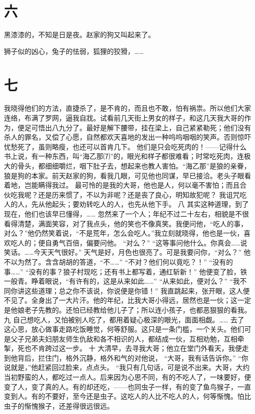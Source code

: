 \documentclass[12pt,UTF8]{ctexbook}
\begin{document}
\section{六}

黑漆漆的，不知是日是夜。赵家的狗又叫起来了。

狮子似的凶心，兔子的怯弱，狐狸的狡猾，……

\section{七}

我晓得他们的方法，直捷杀了，是不肯的，而且也不敢，怕有祸祟。所以他们大家连络，布满了罗网，逼我自戕。试看前几天街上男女的样子，和这几天我大哥的作为，便足可悟出八九分了。最好是解下腰带，挂在梁上，自己紧紧勒死；他们没有杀人的罪名，又偿了心愿，自然都欢天喜地的发出一种呜呜咽咽的笑声。否则惊吓忧愁死了，虽则略瘦，也还可以首肯几下。
他们是只会吃死肉的！——记得什么书上说，有一种东西，叫“海乙那⑺”的，眼光和样子都很难看；时常吃死肉，连极大的骨头，都细细嚼烂，咽下肚子去，想起来也教人害怕。“海乙那”是狼的亲眷，狼是狗的本家。前天赵家的狗，看我几眼，可见他也同谋，早已接洽。老头子眼看着地，岂能瞒得我过。
最可怜的是我的大哥，他也是人，何以毫不害怕；而且合伙吃我呢？还是历来惯了，不以为非呢？还是丧了良心，明知故犯呢？
我诅咒吃人的人，先从他起头；要劝转吃人的人，也先从他下手。
八
其实这种道理，到了现在，他们也该早已懂得，……
忽然来了一个人；年纪不过二十左右，相貌是不很看得清楚，满面笑容，对了我点头，他的笑也不像真笑。我便问他，“吃人的事，对么？”他仍然笑着说，“不是荒年，怎么会吃人。”我立刻就晓得，他也是一伙，喜欢吃人的；便自勇气百倍，偏要问他。
“对么？”
“这等事问他什么。你真会……说笑话。……今天天气很好。”
天气是好，月色也很亮了。可是我要问你，“对么？”
他不以为然了。含含胡胡的答道，“不……”
“不对？他们何以竟吃？！”
“没有的事……”
“没有的事？狼子村现吃；还有书上都写着，通红斩新！”
他便变了脸，铁一般青。睁着眼说，“有许有的，这是从来如此……”
“从来如此，便对么？”
“我不同你讲这些道理；总之你不该说，你说便是你错！”
我直跳起来，张开眼，这人便不见了。全身出了一大片汗。他的年纪，比我大哥小得远，居然也是一伙；这一定是他娘老子先教的。还怕已经教给他儿子了；所以连小孩子，也都恶狠狠的看我。
九
自己想吃人，又怕被别人吃了，都用着疑心极深的眼光，面面相觑。……
去了这心思，放心做事走路吃饭睡觉，何等舒服。这只是一条门槛，一个关头。他们可是父子兄弟夫妇朋友师生仇敌和各不相识的人，都结成一伙，互相劝勉，互相牵掣，死也不肯跨过这一步。
十
大清早，去寻我大哥；他立在堂门外看天，我便走到他背后，拦住门，格外沉静，格外和气的对他说，
“大哥，我有话告诉你。”
“你说就是，”他赶紧回过脸来，点点头。
“我只有几句话，可是说不出来。大哥，大约当初野蛮的人，都吃过一点人。后来因为心思不同，有的不吃人了，一味要好，便变了人，变了真的人。有的却还吃，——也同虫子一样，有的变了鱼鸟猴子，一直变到人。有的不要好，至今还是虫子。这吃人的人比不吃人的人，何等惭愧。怕比虫子的惭愧猴子，还差得很远很远。
\end{document}

